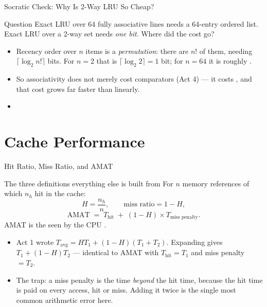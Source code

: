\documentclass[aspectratio=169]{beamer}
\begin{document}
\begin{frame}{Socratic Check: Why Is 2-Way LRU So Cheap?}
  \begin{alertblock}{Question}
    Exact LRU over 64 fully associative lines needs a 64-entry ordered list.
    Exact LRU over a 2-way set needs \emph{one bit}. Where did the cost go?
  \end{alertblock}
  \begin{itemize}
    \item Recency order over $n$ items is a \emph{permutation}: there are $n!$
      of them, needing $\lceil \log_2 n! \rceil$ bits. For $n = 2$ that is
      $\lceil \log_2 2 \rceil = 1$ bit; for $n = 64$ it is roughly
      .
    \item So associativity does not merely cost comparators (Act 4) --- it
      costs , and that cost grows far faster
      than linearly.
    \item {}
  \end{itemize}
\end{frame}


\section{Cache Performance}

\begin{frame}{Hit Ratio, Miss Ratio, and AMAT}
  \begin{block}{The three definitions everything else is built from}
    For $n$ memory references of which $n_h$ hit in the cache:
    \[
      H = \frac{n_h}{n}, \qquad
      \text{miss ratio} = 1 - H,
    \]
    \[
      \text{AMAT} \;=\; T_{\text{hit}} \;+\; (1-H)\times T_{\text{miss penalty}} .
    \]
    AMAT is the  seen by the CPU
    \cite[\S5.3, p.~397]{PattersonHennessy2017_computer_organization_design}.
  \end{block}
  \begin{itemize}
    \item {} Act 1 wrote
      $T_{\text{avg}} = H T_1 + (1-H)(T_1+T_2)$. Expanding gives
      $T_1 + (1-H)T_2$ --- identical to AMAT with
      $T_{\text{hit}} = T_1$ and miss penalty $= T_2$.
    \item The trap: a miss penalty is the  time \emph{beyond} the
      hit time, because the hit time is paid on every access, hit or miss.
      Adding it twice is the single most common arithmetic error here.
  \end{itemize}
\end{frame}
\end{document}
